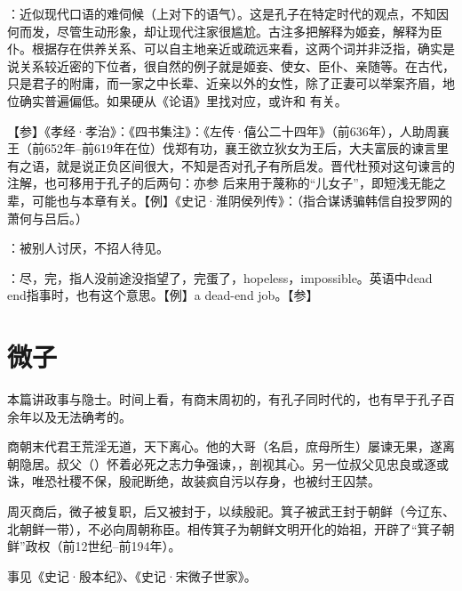 {
\item {}：近似现代口语的难伺候（上对下的语气）。这是孔子在特定时代的观点，不知因何而发，尽管生动形象，却让现代注家很尴尬。古注多把解释为姬妾，解释为臣仆。根据存在供养关系、可以自主地亲近或疏远来看，这两个词并非泛指，确实是说关系较近密的下位者，很自然的例子就是姬妾、使女、臣仆、亲随等。在古代，只是君子的附庸，而一家之中长辈、近亲以外的女性，除了正妻可以举案齐眉，地位确实普遍偏低。如果硬从《论语》里找对应，或许和  有关。

【参】《孝经·孝治》：《四书集注》：《左传·僖公二十四年》（前636年），人助周襄王（前652年--前619年在位）伐郑有功，襄王欲立狄女为王后，大夫富辰的谏言里有之语，就是说正负区间很大，不知是否对孔子有所启发。晋代杜预对这句谏言的注解，也可移用于孔子的后两句：亦参  后来用于蔑称的“儿女子”，即短浅无能之辈，可能也与本章有关。【例】《史记·淮阴侯列传》：（指合谋诱骗韩信自投罗网的萧何与吕后。）
}
{}


{
\item {}：被别人讨厌，不招人待见。

\item {}：尽，完，指人没前途没指望了，完蛋了，hopeless，impossible。英语中dead end指事时，也有这个意思。【例】a dead-end job。【参】
}
{}



\chapter{微子}

本篇讲政事与隐士。时间上看，有商末周初的，有孔子同时代的，也有早于孔子百余年以及无法确考的。

\bigskip

{
\item {}商朝末代君王荒淫无道，天下离心。他的大哥（名启，庶母所生）屡谏无果，遂离朝隐居。叔父（）怀着必死之志力争强谏，，剖视其心。另一位叔父见忠良或逐或诛，唯恐社稷不保，殷祀断绝，故装疯自污以存身，也被纣王囚禁。%

周灭商后，微子被复职，后又被封于，以续殷祀。箕子被武王封于朝鲜（今辽东、北朝鲜一带），不必向周朝称臣。相传箕子为朝鲜文明开化的始祖，开辟了“箕子朝鲜”政权（前12世纪--前194年）。

事见《史记·殷本纪》、《史记·宋微子世家》。
}
{}



